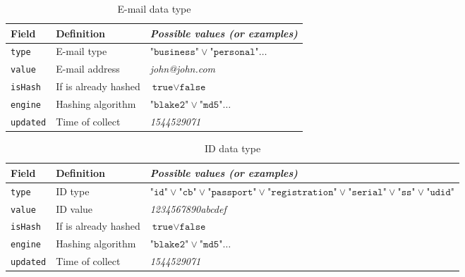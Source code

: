 \documentclass[twoside,twocolumn]{article}
\theoremstyle{definition}
\theoremstyle{remark}
\begin{document}
\begin{table*}
    \centering
    \caption{E-mail data type}
    \begin{tabular*}{0.75\textwidth}{l|l||l}
        Field & Definition & \textit{Possible values (or examples)} \\
        \hline \hline
        \texttt{type} & E-mail type & $\texttt{"business"} \vee \texttt{"personal"} \dots$ \\
        \hline
        \texttt{value} & E-mail address & \textit{john@john.com} \\
        \hline
        \texttt{isHash} & If is already hashed & $\texttt{true} \vee \texttt{false}$ \\
        \hline
        \texttt{engine} & Hashing algorithm & $\texttt{"blake2"} \vee \texttt{"md5"} \dots$ \\
        \hline
        \texttt{updated} & Time of collect & \textit{1544529071}
        \label{table:emails}
    \end{tabular*}
\end{table*}

\begin{table*}
    \centering
    \caption{ID data type}
    \begin{tabular*}{1.13\textwidth}{l|l||l}
        Field & Definition & \textit{Possible values (or examples)} \\
        \hline \hline
        \texttt{type} & ID type & $\texttt{"id"} \vee \texttt{"cb"} \vee \texttt{"passport"} \vee \texttt{"registration"} \vee \texttt{"serial"} \vee \texttt{"ss"} \vee \texttt{"udid"}$ \\
        \hline
        \texttt{value} & ID value & \textit{1234567890abcdef} \\
        \hline
        \texttt{isHash} & If is already hashed & $\texttt{true} \vee \texttt{false}$ \\
        \hline
        \texttt{engine} & Hashing algorithm & $\texttt{"blake2"} \vee \texttt{"md5"} \dots$ \\
        \hline
        \texttt{updated} & Time of collect & \textit{1544529071}
        \label{table:ids}
    \end{tabular*}
\end{table*}
\end{document}
